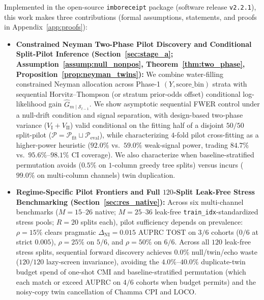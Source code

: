 \documentclass[11pt]{article}
\theoremstyle{remark}
\begin{document}
Implemented in the open-source \texttt{imboreceipt} package (software release \texttt{v2.2.1}), this work makes three contributions (formal assumptions, statements, and proofs in Appendix~\ref{app:proofs}):
\begin{itemize}
  \item \textbf{Constrained Neyman Two-Phase Pilot Discovery and Conditional Split-Pilot Inference (Section~\ref{sec:stage_a}; Assumption~\ref{assump:null_nonpos}, Theorem~\ref{thm:two_phase}, Proposition~\ref{prop:neyman_twins}):} We combine water-filling constrained Neyman allocation across Phase-1 $(Y, \text{score\_bin})$ strata with sequential Horvitz--Thompson (or \citealp{breslow1988logistic} stratum prior-odds offset) conditional log-likelihood gain $\hat{G}_{m \mid \mathcal{S}_{t-1}}$. We show asymptotic sequential FWER control under a null-drift condition and signal separation, with design-based two-phase variance ($V_{\text{I}} + V_{\text{II}}$) valid conditional on the fitting half of a disjoint $50/50$ split-pilot ($\mathcal{P} = \mathcal{P}_{\text{fit}} \sqcup \mathcal{P}_{\text{eval}}$), while characterizing $4$-fold pilot cross-fitting as a higher-power heuristic ($92.0\%$ vs.\ $59.0\%$ weak-signal power, trading $84.7\%$ vs.\ $95.6\%\text{--}98.1\%$ CI coverage). We also characterize when baseline-stratified permutation avoids ($0.5\%$ on $1$-column greedy tree splits) versus incurs ($99.0\%$ on multi-column channels) twin duplication.
  \item \textbf{Regime-Specific Pilot Frontiers and Full $120$-Split Leak-Free Stress Benchmarking (Section~\ref{sec:res_native}):} Across six multi-channel benchmarks ($M = 15\text{--}26$ native; $M = 25\text{--}36$ leak-free \texttt{train\_idx}-standardized stress pools; $R = 20$ splits each), pilot sufficiency depends on prevalence: $\rho = 15\%$ clears pragmatic $\Delta_{\text{NI}} = 0.015$ AUPRC TOST on $3/6$ cohorts ($0/6$ at strict $0.005$), $\rho = 25\%$ on $5/6$, and $\rho = 50\%$ on $6/6$. Across all $120$ leak-free stress splits, sequential forward discovery achieves $0.0\%$ null/twin/echo waste ($120/120$ lazy-screen invariance), avoiding the $4.0\%\text{--}40.0\%$ duplicate-twin budget spend of one-shot CMI and baseline-stratified permutation (which each match or exceed AUPRC on $4/6$ cohorts when budget permits) and the noisy-copy twin cancellation of Chamma CPI and LOCO.

\end{itemize}
\end{document}
